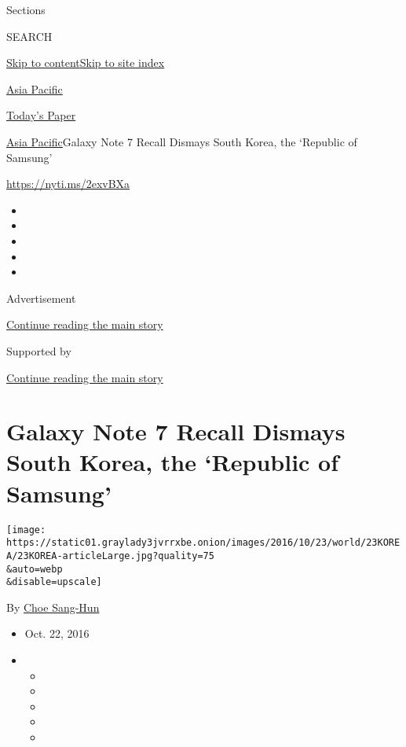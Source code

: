 Sections

SEARCH

\protect\hyperlink{site-content}{Skip to
content}\protect\hyperlink{site-index}{Skip to site index}

\href{https://www.nytimes3xbfgragh.onion/section/world/asia}{Asia
Pacific}

\href{https://myaccount.nytimes3xbfgragh.onion/auth/login?response_type=cookie\&client_id=vi}{}

\href{https://www.nytimes3xbfgragh.onion/section/todayspaper}{Today's
Paper}

\href{/section/world/asia}{Asia Pacific}\textbar{}Galaxy Note 7 Recall
Dismays South Korea, the `Republic of Samsung'

\url{https://nyti.ms/2exvBXa}

\begin{itemize}
\item
\item
\item
\item
\item
\end{itemize}

Advertisement

\protect\hyperlink{after-top}{Continue reading the main story}

Supported by

\protect\hyperlink{after-sponsor}{Continue reading the main story}

\hypertarget{galaxy-note-7-recall-dismays-south-korea-the-republic-of-samsung}{%
\section{Galaxy Note 7 Recall Dismays South Korea, the `Republic of
Samsung'}\label{galaxy-note-7-recall-dismays-south-korea-the-republic-of-samsung}}

\texttt{[image: https://static01.graylady3jvrrxbe.onion/images/2016/10/23/world/23KOREA/23KOREA-articleLarge.jpg?quality=75\\\&auto=webp\\\&disable=upscale]}

By \href{http://www.nytimes3xbfgragh.onion/by/choe-sang-hun}{Choe
Sang-Hun}

\begin{itemize}
\item
  Oct. 22, 2016
\item
  \begin{itemize}
  \item
  \item
  \item
  \item
  \item
  \end{itemize}
\end{itemize}

